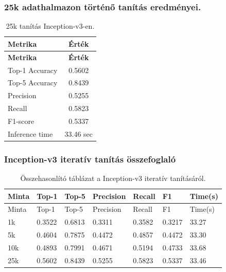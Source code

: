 \subsubsection{25k adathalmazon történő tanítás eredményei.}
  \begin{center}
    \begin{longtable}{l c}
    \caption{25k tanítás Inception-v3-en.} \label{tab:phase03_Inception-v3_25k} \\
    \toprule
    \textbf{Metrika} & \textbf{Érték} \\
    \midrule
    \endfirsthead
    \toprule
    \textbf{Metrika} & \textbf{Érték} \\
    \midrule
    \endhead
    Top-1 Accuracy & 0.5602 \\
    Top-5 Accuracy & 0.8439 \\
    Precision      & 0.5255 \\
    Recall         & 0.5823 \\
    F1-score       & 0.5337 \\
    Inference time & 33.46 sec \\
    \bottomrule
    \end{longtable}
  \end{center}

\subsubsection{Inception-v3 iteratív tanítás összefoglaló}
  \begin{center}
    \begin{longtable}{lllllll}
    \caption{Összehasonlító táblázat a Inception-v3 iteratív tanításáról.}\label{tab:phase3_Inception-v3_summary_table}\\
    \toprule
    Minta & Top-1 & Top-5 & Precision & Recall & F1 & Time(s) \\
    \midrule
    \endfirsthead
    \toprule
    Minta & Top-1 & Top-5 & Precision & Recall & F1 & Time(s) \\
    \midrule
    \endhead
    1k & 0.3522 & 0.6813 & 0.3311 & 0.3582 & 0.3217 & 33.27 \\
    5k & 0.4604 & 0.7875 & 0.4472 & 0.4857 & 0.4472 & 33.30 \\
    10k & 0.4893 & 0.7991 & 0.4671 & 0.5194 & 0.4733 & 33.68 \\
    25k & 0.5602 & 0.8439 & 0.5255 & 0.5823 & 0.5337 & 33.46 \\
    \bottomrule
    \end{longtable}
  \end{center}

